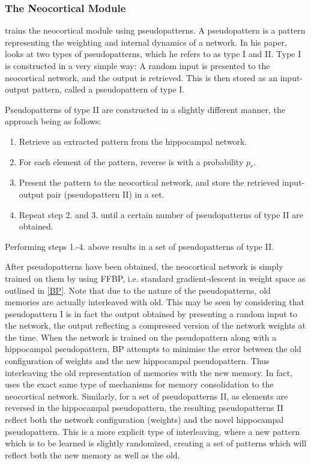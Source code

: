 \subsubsection{The Neocortical Module}

\cite{Hattori2010} trains the neocortical module using pseudopatterns. A pseudopattern is a pattern representing the weighting and internal dynamics of a network. In his paper, \cite{Hattori2010} looks at two types of pseudopatterns, which he refers to as type I and II. Type I is constructed in a very simple way: A random input is presented to the neocortical network, and the output is retrieved. This is then stored as an input-output pattern, called a pseudopattern of type I.

Pseudopatterns of type II are constructed in a slightly different manner, the approach being as follows:

\begin{enumerate}
\item Retrieve an extracted pattern from the hippocampal network.
\item For each element of the pattern, reverse is with a probability $p_r$.
\item Present the pattern to the neocortical network, and store the retrieved input-output pair (pseudopattern II) in a set.
\item Repeat step 2. and 3. until a certain number of pseudopatterns of type II are obtained.
\end{enumerate}
Performing steps 1.-4. above results in a set of pseudopatterns of type II.

After pseudopatterns have been obtained, the neocortical network is simply trained on them by using FFBP, i.e. standard gradient-descent in weight space as outlined in \ref{BP}. Note that due to the nature of the pseudopatterns, old memories are actually interleaved with old. This may be seen by considering that pseudopattern I is in fact the output obtained by presenting a random input to the network, the output reflecting a compressed version of the network weights at the time. When the network is trained on the pseudopattern along with a hippocampal pseudopattern, BP attempts to minimise the error between the old configuration of weights and the new hippocampal pseudopattern. Thus interleaving the old representation of memories with the new memory. In fact, \cite{Hattori2014} uses the exact same type of mechanisms for memory consolidation to the neocortical network.
Similarly, for a set of pseudopatterns II, as elements are reversed in the hippocampal pseudopattern, the resulting pseudopatterns II reflect both the network configuration (weights) and the novel hippocampal pseudopattern. This is a more explicit type of interleaving, where a new pattern which is to be learned is slightly randomized, creating a set of patterns which will reflect both the new memory as well as the old.

